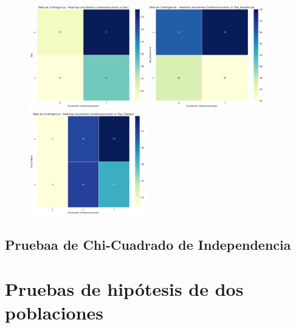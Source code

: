 \documentclass[a4paper, 12pt]{article}
\begin{document}
\begin{figure}[H]
    \includegraphics[width=0.45\textwidth]{img/Heatmap/Accidentes_Sex.png} \hspace{0.5cm}
    \includegraphics[width=0.45\textwidth]{img/Heatmap/Accidentes_Tipo_Residencia.png} \vspace{0.5cm}
    \vspace{0.3cm}
    \includegraphics[width=0.45\textwidth]{img/Heatmap/Accidentes_Tipo_Trabajo.png}
\end{figure}

\subsection{Pruebaa de Chi-Cuadrado de Independencia}

\section{Pruebas de hipótesis de dos poblaciones}
\end{document}
